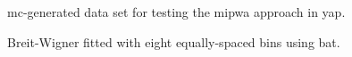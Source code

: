 \documentclass[
	fontsize=10pt,
	open=right,
	twoside,
    english,
    draft,
]{scrbook}
\begin{document}
\begin{figure}
    \centering
    \caption{\ac{mc}-generated data set for testing the \ac{mipwa} approach in \ac{yap}.}
    \label{fig:mi_test_data}
\end{figure}



\begin{figure}
    \centering
    
    \caption{Breit-Wigner fitted with eight equally-spaced bins using \ac{bat}.}
    \label{fig:mi_test_fit_amp_8bins}
\end{figure}

%
\backmatter
	\printnoidxglossaries

	\cleardoublepage
	\printindex

	\cleardoublepage
	\nocite{*}
	\printbibliography
\end{document}
